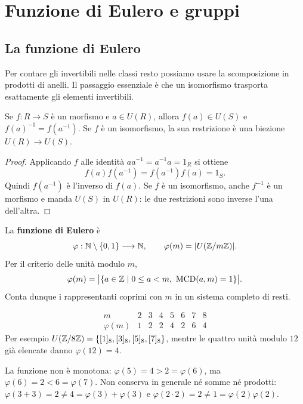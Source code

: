 \chapter{Funzione di Eulero e gruppi}\label{cap:eulero-gruppi}

\section{La funzione di Eulero}
Per contare gli invertibili nelle classi resto possiamo usare la scomposizione in prodotti di anelli. Il passaggio essenziale è che un isomorfismo trasporta esattamente gli elementi invertibili.

\begin{proposizione}\label{prop:trasporto-unita}
Se $f:R\to S$ è un morfismo e $a\in U(R)$, allora $f(a)\in U(S)$ e $f(a)^{-1}=f(a^{-1})$. Se $f$ è un isomorfismo, la sua restrizione è una biezione $U(R)\to U(S)$.
\end{proposizione}
\begin{proof}
Applicando $f$ alle identità $aa^{-1}=a^{-1}a=1_R$ si ottiene
\[
f(a)f(a^{-1})=f(a^{-1})f(a)=1_S.
\]
Quindi $f(a^{-1})$ è l'inverso di $f(a)$. Se $f$ è un isomorfismo, anche $f^{-1}$ è un morfismo e manda $U(S)$ in $U(R)$: le due restrizioni sono inverse l'una dell'altra.
\end{proof}

\begin{definizione}
La \textbf{funzione di Eulero} è
\[
\varphi:\mathbb{N}\setminus\{0,1\}\longrightarrow\mathbb{N},\qquad
\varphi(m)=|U(\mathbb{Z}/m\mathbb{Z})|.
\]
Per il criterio delle unità modulo $m$,
\[
\varphi(m)=\bigl|\{a\in\Z\mid 0\le a<m,\ \operatorname{MCD}(a,m)=1\}\bigr|.
\]
Conta dunque i rappresentanti coprimi con $m$ in un sistema completo di resti.
\end{definizione}

\begin{esempio}
\[
\begin{array}{c|rrrrrrr}
m&2&3&4&5&6&7&8\\\hline
\varphi(m)&1&2&2&4&2&6&4
\end{array}
\]
Per esempio $U(\mathbb{Z}/8\mathbb{Z})=\{[1]_8,[3]_8,[5]_8,[7]_8\}$, mentre le quattro unità modulo $12$ già elencate danno $\varphi(12)=4$.

La funzione non è monotona: $\varphi(5)=4>2=\varphi(6)$, ma $\varphi(6)=2<6=\varphi(7)$. Non conserva in generale né somme né prodotti: $\varphi(3+3)=2\ne4=\varphi(3)+\varphi(3)$ e $\varphi(2\cdot2)=2\ne1=\varphi(2)\varphi(2)$.
\end{esempio}

